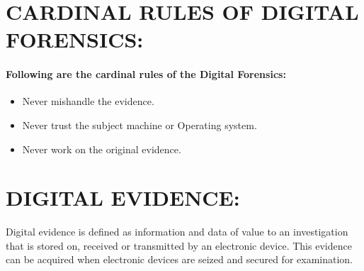 \documentclass[10pt,british,english]{article}
\begin{document}
\section{CARDINAL RULES OF DIGITAL FORENSICS:}

\paragraph{Following are the cardinal rules of the Digital Forensics:}
\begin{itemize}
\item Never mishandle the evidence.
\item Never trust the subject machine or Operating system.
\item Never work on the original evidence.
\end{itemize}

\section{DIGITAL EVIDENCE:}

Digital evidence is defined as information and data of value to an
investigation that is stored on, received or transmitted by an electronic
device. This evidence can be acquired when electronic devices are
seized and secured for examination. 
\end{document}
